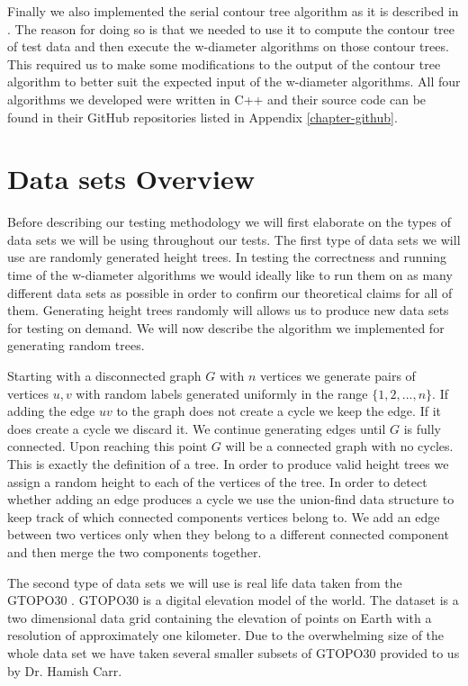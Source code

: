 Finally we also implemented the serial contour tree algorithm as it is described in \cite{ct-big-paper}. The reason for doing so is that we needed to use it to compute the contour tree of test data and then execute the w-diameter algorithms on those contour trees. This required us to make some modifications to the output of the contour tree algorithm to better suit the expected input of the w-diameter algorithms. All four algorithms we developed were written in C++ and their source code can be found in their GitHub repositories listed in Appendix \ref{chapter-github}.


\section{Data sets Overview}

Before describing our testing methodology we will first elaborate on the types of data sets we will be using throughout our tests. The first type of data sets we will use are randomly generated height trees. In testing the correctness and running time of the w-diameter algorithms we would ideally like to run them on as many different data sets as possible in order to confirm our theoretical claims for all of them. Generating height trees randomly will allows us to produce new data sets for testing on demand. We will now describe the algorithm we implemented for generating random trees.

Starting with a disconnected graph $G$ with $n$ vertices we generate pairs of vertices $u, v$ with random labels generated uniformly in the range $\{1, 2, ..., n\}$. If adding the edge $uv$ to the graph does not create a cycle we keep the edge. If it does create a cycle we discard it. We continue generating edges until $G$ is fully connected. Upon reaching this point $G$ will be a connected graph with no cycles. This is exactly the definition of a tree. In order to produce valid height trees we assign a random height to each of the vertices of the tree. In order to detect whether adding an edge produces a cycle we use the union-find data structure to keep track of which connected components vertices belong to. We add an edge between two vertices only when they belong to a different connected component and then merge the two components together.

The second type of data sets we will use is real life data taken from the GTOPO30 \cite{gtopo}. GTOPO30  is a digital elevation model of the world. The dataset is a two dimensional data grid containing the elevation of points on Earth with a resolution of approximately one kilometer. Due to the overwhelming size of the whole data set we have taken several smaller subsets of GTOPO30 provided to us by Dr. Hamish Carr.

